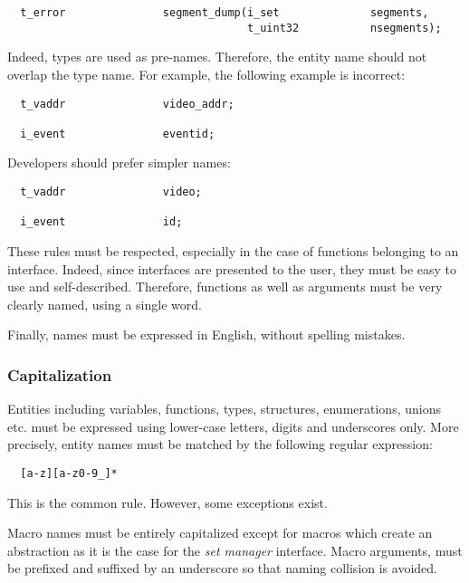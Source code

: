 \begin{verbatim}
  t_error               segment_dump(i_set              segments,
                                     t_uint32           nsegments);
\end{verbatim}

Indeed, types are used as pre-names. Therefore, the entity name should
not overlap the type name. For example, the following example is incorrect:

\begin{verbatim}
  t_vaddr               video_addr;

  i_event               eventid;
\end{verbatim}

Developers should prefer simpler names:

\begin{verbatim}
  t_vaddr               video;

  i_event               id;
\end{verbatim}

These rules must be respected, especially in the case of functions belonging
to an interface. Indeed, since interfaces are presented to the user, they
must be easy to use and self-described. Therefore, functions as well as
arguments must be very clearly named, using a single word.

Finally, names must be expressed in English, without spelling mistakes.


\subsubsection{Capitalization}

Entities including variables, functions, types, structures, enumerations,
unions etc. must be expressed using lower-case letters, digits and underscores
only. More precisely, entity names must be matched by the following
regular expression:

\begin{verbatim}
  [a-z][a-z0-9_]*
\end{verbatim}

This is the common rule. However, some exceptions exist.

Macro names must be entirely capitalized except for macros which create
an abstraction as it is the case for the \textit{set manager} interface. Macro
arguments, must be prefixed and suffixed by an underscore so that naming
collision is avoided.


